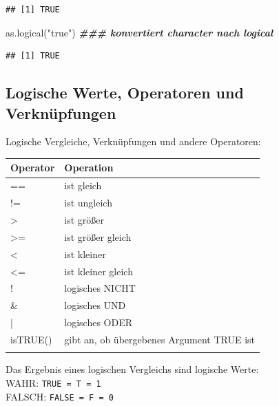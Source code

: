 \documentclass[
]{book}
\newenvironment{Shaded}{\begin{snugshade}}{\end{snugshade}}
\newcommand{\DocumentationTok}[1]{\textcolor[rgb]{0.56,0.35,0.01}{\textbf{\textit{#1}}}}
\newcommand{\FunctionTok}[1]{\textcolor[rgb]{0.00,0.00,0.00}{#1}}
\newcommand{\NormalTok}[1]{#1}
\newcommand{\StringTok}[1]{\textcolor[rgb]{0.31,0.60,0.02}{#1}}
\begin{document}
\begin{verbatim}
## [1] TRUE
\end{verbatim}

\begin{Shaded}
\begin{Highlighting}[]
\FunctionTok{as.logical}\NormalTok{(}\StringTok{"true"}\NormalTok{)  }\DocumentationTok{\#\#\# konvertiert character nach logical}
\end{Highlighting}
\end{Shaded}

\begin{verbatim}
## [1] TRUE
\end{verbatim}

\hypertarget{logische-werte-operatoren-und-verknuxfcpfungen}{%
\subsection*{Logische Werte, Operatoren und Verknüpfungen}\label{logische-werte-operatoren-und-verknuxfcpfungen}}

Logische Vergleiche, Verknüpfungen und andere Operatoren:

\begin{table}
\centering\begingroup\fontsize{15}{17}\selectfont

\begin{tabular}[t]{l|l}
\hline
Operator & Operation\\
\hline
== & ist gleich\\
\hline
!= & ist ungleich\\
\hline
> & ist größer\\
\hline
>= & ist größer gleich\\
\hline
< & ist kleiner\\
\hline
<= & ist kleiner gleich\\
\hline
! & logisches NICHT\\
\hline
\& & logisches UND\\
\hline
| & logisches ODER\\
\hline
isTRUE() & gibt an, ob übergebenes Argument TRUE ist\\
\hline
 & \\
\hline
\end{tabular}
\endgroup{}
\end{table}

Das Ergebnis eines logischen Vergleichs sind logische Werte:\\
WAHR: \texttt{TRUE\ =\ T\ =\ 1}\\
FALSCH: \texttt{FALSE\ =\ F\ =\ 0}
\end{document}
